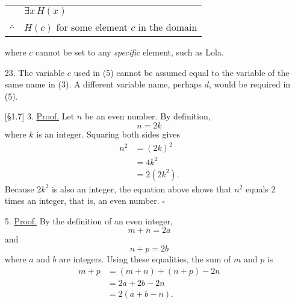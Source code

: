 \documentclass{article}
\begin{document}
\begin{enumerate}
                    \begin{tabular}{cl}
                    & $\exists x \, H(x)$ \\\cline{2-2}
                    $\therefore$ & $H(c)$ for some element $c$ in the domain
                    \end{tabular}

                where $c$ cannot be set to any \emph{specific} element, such as Lola.
    \item[23.] The variable $c$ used in (5) cannot be assumed equal to the variable of the same name in (3). A different variable name, perhaps $d$, would be required in (5).
    \item[{[\S 1.7]} 3.] \underline{Proof.} Let $n$ be an even number. By definition,
    \[
    n = 2k
    \]
    where $k$ is an integer. Squaring both sides gives
    \begin{align*}
    n^2 &= (2k)^2 \\
    &= 4k^2 \\
    &= 2 (2k^2).
    \end{align*}
    Because $2k^2$ is also an integer, the equation above shows that $n^2$ equals $2$ times an integer, that is, an even number. $\square$
    \item[5.] \underline{Proof.} By the definition of an even integer,
    \[
    m+n = 2a
    \]
    and
    \[
    n+p = 2b
    \]
    where $a$ and $b$ are integers. Using these equalities, the sum of $m$ and $p$ is
    \begin{align*}
    m+p &= (m+n)+(n+p)-2n \\
    &= 2a + 2b - 2n \\
    &= 2(a+b-n).
    \end{align*}


\end{enumerate}
\end{document}
